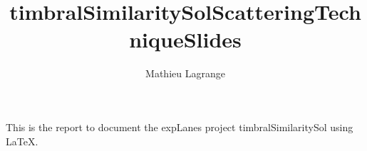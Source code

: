 \documentclass{beamer}
\title{timbralSimilaritySolScatteringTechniqueSlides}
\author{ Mathieu Lagrange }
\begin{document}
 
  
\maketitle 
  
  
This is the report to document the expLanes project timbralSimilaritySol using \LaTeX. 
  
  
  
 
 
  
\end{document}
